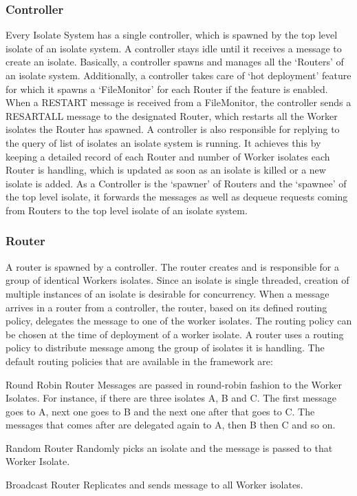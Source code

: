   \subsubsection{Controller}
  Every Isolate System has a single controller, which is spawned by the top level isolate of an isolate system. A controller stays idle until it receives a message to create an isolate. Basically, a controller spawns and manages all the ‘Routers’ of an isolate system. Additionally, a controller takes care of ‘hot deployment’ feature for which it spawns a ‘FileMonitor’ for each Router if the feature is enabled. When a RESTART message is received from a FileMonitor, the controller sends a RESART\textunderscore{}ALL message to the designated Router, which restarts all the Worker isolates the Router has spawned.
  A controller is also responsible for replying to the query of list of isolates an isolate system is running. It achieves this by keeping a detailed record of each Router and number of Worker isolates each Router is handling, which is updated as soon as an isolate is killed or a new isolate is added.
  As a Controller is the ‘spawner’ of Routers and the ‘spawnee’ of the top level isolate, it forwards the messages as well as dequeue requests coming from Routers to the top level isolate of an isolate system.

  \subsubsection{Router}
  A router is spawned by a controller. The router creates and is responsible for a group of identical Workers isolates. Since an isolate is single threaded, creation of multiple instances of an isolate is desirable for concurrency. When a message arrives in a router from a controller, the router, based on its defined routing policy, delegates the message to one of the worker isolates. The routing policy can be chosen at the time of deployment of a worker isolate.
  A router uses a routing policy to distribute message among the group of isolates it is handling. The default routing policies that are available in the framework are:

  \begin{description}
    \item{Round Robin Router} Messages are passed in round-robin fashion to the Worker Isolates. For instance, if there are three isolates A, B and C. The first message goes to A, next one goes to B and the next one after that goes to C. The messages that comes after are delegated again to A, then B then C and so on.

    \item{Random Router} Randomly picks an isolate and the message is passed to that Worker Isolate.

    \item{Broadcast Router} Replicates and sends message to all Worker isolates.
  \end{description}

